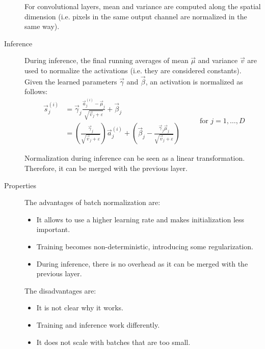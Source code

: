 \begin{description}
        \begin{remark}
            For convolutional layers, mean and variance are computed along the spatial dimension (i.e. pixels in the same output channel are normalized in the same way).
        \end{remark}


    \item[Inference] 
        During inference, the final running averages of mean $\vec{\mu}$ and variance $\vec{v}$ are used to normalize the activations (i.e. they are considered constants).
        Given the learned parameters $\vec{\gamma}$ and $\vec{\beta}$, an activation is normalized as follows:
        \[  
            \begin{split}
                \vec{s}_j^{(i)} &= \vec{\gamma}_j \frac{\vec{a}_j^{(i)} - \vec{\mu}_j}{\sqrt{\vec{v}_j + \varepsilon}} + \vec{\beta}_j \\
                &= \left( \frac{\vec{\gamma}_j}{\sqrt{\vec{v}_j + \varepsilon}} \right) \vec{a}_j^{(i)} + 
                    \left( \vec{\beta}_j - \frac{\vec{\gamma}_j \vec{\mu}_j}{\sqrt{\vec{v}_j + \varepsilon}} \right)
            \end{split}
            \hspace{2em} \text{ for $j = 1, \dots, D$} 
        \]
        
        \begin{remark}
            Normalization during inference can be seen as a linear transformation. Therefore, it can be merged with the previous layer.
        \end{remark}


    \item[Properties]
        The advantages of batch normalization are:
        \begin{itemize}
            \item It allows to use a higher learning rate and makes initialization less important.
            \item Training becomes non-deterministic, introducing some regularization.
            \item During inference, there is no overhead as it can be merged with the previous layer.
        \end{itemize}
        The disadvantages are:
        \begin{itemize}
            \item It is not clear why it works.
            \item Training and inference work differently.
            \item It does not scale with batches that are too small.
        \end{itemize}


\end{description}
